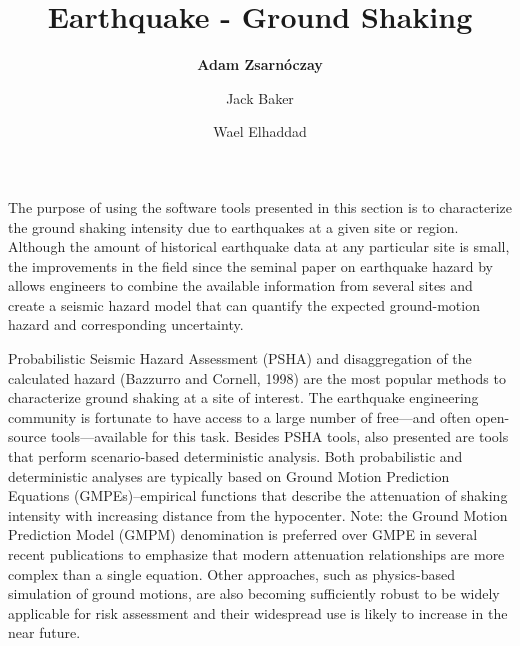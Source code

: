 %
%
%

\title{Earthquake - Ground Shaking}
\author{
    \textbf{Adam Zsarnóczay} 
    \and Jack Baker 
    \and Wael Elhaddad}
\tocauthor{}
%
%
\maketitle

The purpose of using the software tools presented in this section is to characterize the ground shaking intensity due to earthquakes at a given site or region. Although the amount of historical earthquake data at any particular site is small, the improvements in the field since the seminal paper on earthquake hazard by \cite{cornell1968engineering} allows engineers to combine the available information from several sites and create a seismic hazard model that can quantify the expected ground-motion hazard and corresponding uncertainty. 

Probabilistic Seismic Hazard Assessment (PSHA) and disaggregation of the calculated hazard (Bazzurro and Cornell, 1998) are the most popular methods to characterize ground shaking at a site of interest. The earthquake engineering community is fortunate to have access to a large number of free—and often open-source tools—available for this task. Besides PSHA tools, also presented are tools that perform scenario-based deterministic analysis. Both probabilistic and deterministic analyses are typically based on Ground Motion Prediction Equations (GMPEs)–empirical functions that describe the attenuation of shaking intensity with increasing distance from the hypocenter. Note: the Ground Motion Prediction Model (GMPM) denomination is preferred over GMPE in several recent publications to emphasize that modern attenuation relationships are more complex than a single equation. Other approaches, such as physics-based simulation of ground motions, are also becoming sufficiently robust to be widely applicable for risk assessment and their widespread use is likely to increase in the near future. 

